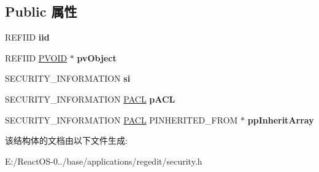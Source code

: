 \subsection*{Public 属性}
\begin{DoxyCompactItemize}
\item 
\mbox{\label{structiface_i_security_object_type_info_vbtl_a91558a83dfe82530dc82eca30b174b01}} 
R\+E\+F\+I\+ID {\bfseries iid}
\item 
\mbox{\label{structiface_i_security_object_type_info_vbtl_a06dedbbb956cb28a00bb96bf40c0746e}} 
R\+E\+F\+I\+ID \hyperlink{interfacevoid}{P\+V\+O\+ID} $\ast$ {\bfseries pv\+Object}
\item 
\mbox{\label{structiface_i_security_object_type_info_vbtl_aa35d777bd989343ec133cf819addac11}} 
S\+E\+C\+U\+R\+I\+T\+Y\+\_\+\+I\+N\+F\+O\+R\+M\+A\+T\+I\+ON {\bfseries si}
\item 
\mbox{\label{structiface_i_security_object_type_info_vbtl_acb060d4d29036672ad8f6f9ae4f129ad}} 
S\+E\+C\+U\+R\+I\+T\+Y\+\_\+\+I\+N\+F\+O\+R\+M\+A\+T\+I\+ON \hyperlink{struct___a_c_l}{P\+A\+CL} {\bfseries p\+A\+CL}
\item 
\mbox{\label{structiface_i_security_object_type_info_vbtl_ac33df161f0a3aac1532bb761e1fe975e}} 
S\+E\+C\+U\+R\+I\+T\+Y\+\_\+\+I\+N\+F\+O\+R\+M\+A\+T\+I\+ON \hyperlink{struct___a_c_l}{P\+A\+CL} P\+I\+N\+H\+E\+R\+I\+T\+E\+D\+\_\+\+F\+R\+OM $\ast$ {\bfseries pp\+Inherit\+Array}
\end{DoxyCompactItemize}


该结构体的文档由以下文件生成\+:\begin{DoxyCompactItemize}
\item 
E\+:/\+React\+O\+S-\/0../base/applications/regedit/security.\+h\end{DoxyCompactItemize}
